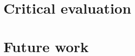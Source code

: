\documentclass[mscres,cdtppar,twoside,openright,logo,rightchapter,normalheadings]{infthesis}
\theoremstyle{definition}
\begin{document}
\section{Critical evaluation}
\label{sec:criticaleval}

\section{Future work}
\label{sec:futurework}



%

\nocite{*}
\singlespace



\end{document}
